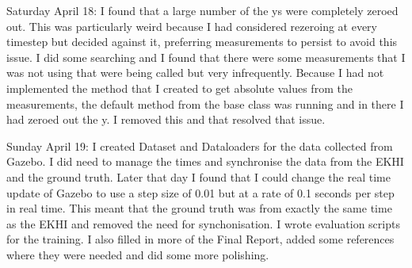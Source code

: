 \documentclass[]{../resources/final_report}
\begin{document}
\begin{appendices}
  Saturday April 18: I found that a large number of the ys were completely zeroed out. This was particularly weird because I had considered rezeroing at every timestep but decided against it, preferring measurements to persist to avoid this issue. I did some searching and I found that there were some measurements that I was not using that were being called but very infrequently. Because I had not implemented the method that I created to get absolute values from the measurements, the default method from the base class was running and in there I had zeroed out the y. I removed this and that resolved that issue.

  Sunday April 19: I created Dataset and Dataloaders for the data collected from Gazebo. I did need to manage the times and synchronise the data from the EKHI and the ground truth. Later that day I found that I could change the real time update of Gazebo to use a step size of 0.01 but at a rate of 0.1 seconds per step in real time. This meant that the ground truth was from exactly the same time as the EKHI and removed the need for synchonisation. I wrote evaluation scripts for the training. I also filled in more of the Final Report, added some references where they were needed and did some more polishing.


\end{appendices}
\end{document}
